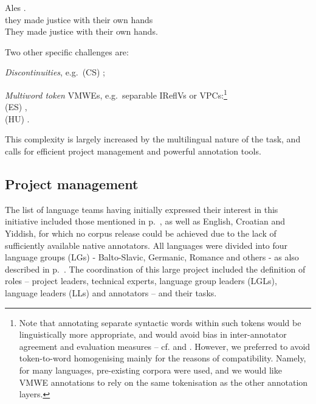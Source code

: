 \documentclass[output=paper,modfonts]{langscibook}
\begin{document}
\begin{sitem}
\begin{sitem}
\ea \label{pt:take-into-hands}
\settowidth {}
\gll Ales      . \\
they made justice with their own hands\\ 
\glt They made justice with their own hands. 
\z

    \end{sitem}
\end{sitem}
Two other specific challenges are:
\begin{sitem}
\item \emph{Discontinuities}, e.g.\ (CS) ;
\item \emph{Multiword token} VMWEs, e.g.\ separable IReflVs or VPCs:\footnote{Note that annotating separate syntactic words within such tokens would be linguistically more appropriate, and would avoid bias in inter-annotator agreement and evaluation measures -- cf.  and \citep{MWEWorkshop}. However, we preferred to avoid token-to-word homogenising mainly for the reasons of compatibility. Namely, for many languages, pre-existing corpora were used, and we would like VMWE annotations to rely on the same tokenisation as the other annotation layers.}\\ (ES) ,\\ (HU) .%

\end{sitem}

\noindent
This complexity is largely increased by the multilingual nature of the task, and calls for efficient project management and powerful annotation tools. 

\subsection{Project management}
\label{sec:management}
%
The list of language teams having initially expressed their interest in this initiative included those mentioned in p.~\pageref{language-groups}, as well as English, Croatian and Yiddish, for which no corpus release could be achieved due to the lack of sufficiently available native annotators. All languages were divided into four language groups (LGs) - Balto-Slavic, Germanic, Romance and others - as also described in p.~\pageref{language-groups}. 
%
The coordination of this large project included the definition of roles -- project leaders, technical experts, language group leaders (LGLs), language leaders (LLs) and annotators -- and their tasks.
\end{document}
